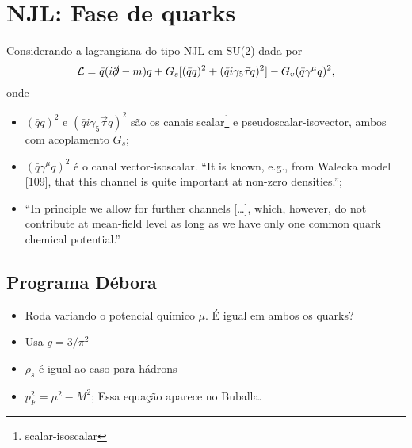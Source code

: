 \section{NJL: Fase de quarks}

Considerando a lagrangiana do tipo NJL em SU(2) dada por
\begin{equation}
	\mathcal{L} = \bar{q}(i\slashed{\partial} - m)q + G_s[(\bar{q}q)^2 + (\bar{q}i\gamma_5\vec{\tau}q)^2] - G_v(\bar{q}\gamma^\mu q)^2,
\end{equation}
%
onde
\begin{itemize}
	\item $(\bar{q}q)^2$ e $(\bar{q}i\gamma_5\vec{\tau}q)^2$ são os canais scalar\footnote{scalar-isoscalar} e pseudoscalar-isovector, ambos com acoplamento $G_s$;
	\item $(\bar{q}\gamma^\mu q)^2$ é o canal vector-isoscalar. ``It is known, e.g., from Walecka model [109], that this channel is quite important at non-zero densities.'';
	\item ``In principle we allow for further channels [\dots], which, however, do not contribute at mean-field level as long as we have only one common quark chemical potential.''
\end{itemize}

\subsection{Programa Débora}

\begin{itemize}
	\item Roda variando o potencial químico $\mu$. É igual em ambos os quarks?
	\item Usa $g = 3/\pi^2$
	\item $\rho_s$ é igual ao caso para hádrons
	\item $p_F^2 = \mu^2 - M^2$; Essa equação aparece no Buballa.
\end{itemize}
